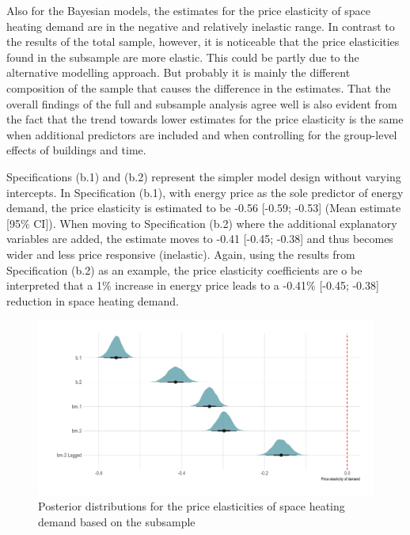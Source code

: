 \documentclass[12pt,twoside]{reedthesis}
\begin{document}
Also for the Bayesian models, the estimates for the price elasticity of space heating demand are in the negative and relatively inelastic range. In contrast to the results of the total sample, however, it is noticeable that the price elasticities found in the subsample are more elastic. This could be partly due to the alternative modelling approach. But probably it is mainly the different composition of the sample that causes the difference in the estimates. That the overall findings of the full and subsample analysis agree well is also evident from the fact that the trend towards lower estimates for the price elasticity is the same when additional predictors are included and when controlling for the group-level effects of buildings and time.

Specifications (b.1) and (b.2) represent the simpler model design without varying intercepts. In Specification (b.1), with energy price as the sole predictor of energy demand, the price elasticity is estimated to be -0.56 {[}-0.59; -0.53{]} (Mean estimate {[}95\% CI{]}). When moving to Specification (b.2) where the additional explanatory variables are added, the estimate moves to -0.41 {[}-0.45; -0.38{]} and thus becomes wider and less price responsive (inelastic). Again, using the results from Specification (b.2) as an example, the price elasticity coefficients are o be interpreted that a 1\% increase in energy price leads to a -0.41\% {[}-0.45; -0.38{]} reduction in space heating demand.
\begin{figure}

{\centering \includegraphics[width=1\linewidth]{figure/posterior-distributions} 

}

\caption{Posterior distributions for the price elasticities of space heating demand based on the subsample}\label{fig:posterior-distributions}
\end{figure}
\end{document}
